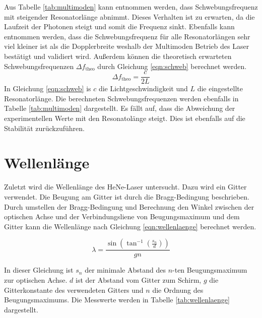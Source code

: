 Aus Tabelle \ref{tab:multimoden} kann entnommen werden, dass Schwebungsfrequenz mit steigender Resonatorlänge abnimmt. Dieses Verhalten ist zu erwarten, da die Laufzeit der Photonen 
steigt und somit die Frequenz sinkt. Ebenfalls kann entnommen werden, dass die Schwebungsfrequenz für alle Resonatorlängen sehr viel kleiner ist als die Dopplerbreite weshalb der 
Multimoden Betrieb des Laser bestätigt und validiert wird. Außerdem können die theoretisch erwarteten Schwebungsfrequenzen $\Delta f_\text{theo}$ durch Gleichung \ref{eqn:schweb} berechnet werden.
\begin{equation}
    \label{eqn:schweb}
    \Delta f_\text{theo} = \frac{c}{2L}
\end{equation} 
In Gleichung \ref{eqn:schweb} is $c$ die Lichtgeschwindigkeit und $L$ die eingestellte Resonatorlänge. Die berechneten Schwebungsfrequenzen werden ebenfalls in Tabelle \ref{tab:multimoden}
dargestellt. Es fällt auf, dass die Abweichung der experimentellen Werte mit den Resonatolänge steigt. Dies ist ebenfalls auf die Stabilität zurückzuführen.




\section{Wellenlänge}
\label{sec:Wellenlänge}
Zuletzt wird die Wellenlänge des HeNe-Laser untersucht. Dazu wird ein Gitter verwendet. Die Beugung am Gitter ist durch die Bragg-Bedingung beschrieben. Durch umstellen der 
Bragg-Bedingung und Berechnung den Winkel zwischen der optischen Achse und der Verbindungsliene von Beugungsmaximum und dem Gitter kann die Wellenlänge nach Gleichung \ref{eqn:wellenlaenge}
berechnet werden.

\begin{equation}
    \label{eqn:wellenlaenge}
    \lambda = \frac{\sin\left(\tan^{-1}\left(\frac{s_n}{d}\right)\right)}{gn}
\end{equation}

In dieser Gleichung ist $s_n$ der minimale Abstand des $n$-ten Beugungsmaximum zur optischen Achse. $d$ ist der Abstand vom Gitter zum Schirm, $g$ die Gitterkonstante des verwendeten 
Gitters und $n$ die Ordnung des Beugungsmaximums. Die Messwerte werden in Tabelle \ref{tab:wellenlaenge} dargestellt.  


